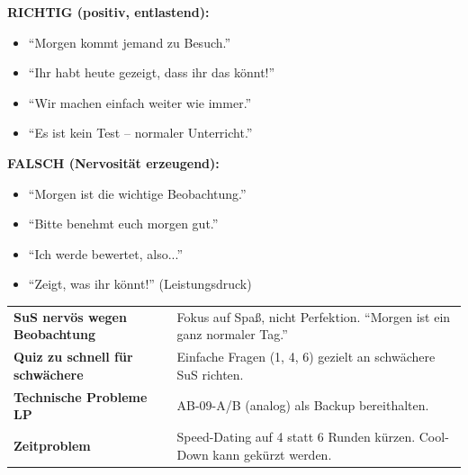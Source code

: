 \documentclass[11pt, a4paper]{article}
\begin{document}
\begin{tcolorbox}[
    colback=white,
    colframe=spanisch,
    title={\footnotesize\bfseries Ausblick-Formulierungen (Phase 5)},
    fonttitle=\bfseries,
    boxrule=0.5pt,
    top=2pt, bottom=2pt, left=4pt, right=4pt
]
\footnotesize
\begin{minipage}[t]{0.48\textwidth}
\textbf{RICHTIG (positiv, entlastend):}
\begin{itemize}
\item ``Morgen kommt jemand zu Besuch.''
\item ``Ihr habt heute gezeigt, dass ihr das könnt!''
\item ``Wir machen einfach weiter wie immer.''
\item ``Es ist kein Test -- normaler Unterricht.''
\end{itemize}
\end{minipage}
\hfill
\begin{minipage}[t]{0.48\textwidth}
\textbf{FALSCH (Nervosität erzeugend):}
\begin{itemize}
\item[\texttimes] ``Morgen ist die wichtige Beobachtung.''
\item[\texttimes] ``Bitte benehmt euch morgen gut.''
\item[\texttimes] ``Ich werde bewertet, also...''
\item[\texttimes] ``Zeigt, was ihr könnt!'' (Leistungsdruck)
\end{itemize}
\end{minipage}
\end{tcolorbox}

\vspace{0.2cm}


\begin{tcolorbox}[
    colback=white,
    colframe=wichtig,
    title={\footnotesize\bfseries Erwartete Schwierigkeiten},
    fonttitle=\bfseries,
    boxrule=0.5pt,
    top=2pt, bottom=2pt, left=4pt, right=4pt
]
\footnotesize
\begin{tabularx}{\textwidth}{@{}p{4cm}X@{}}
\textbf{SuS nervös wegen Beobachtung} & Fokus auf Spaß, nicht Perfektion. ``Morgen ist ein ganz normaler Tag.'' \\
\textbf{Quiz zu schnell für schwächere} & Einfache Fragen (1, 4, 6) gezielt an schwächere SuS richten. \\
\textbf{Technische Probleme LP} & AB-09-A/B (analog) als Backup bereithalten. \\
\textbf{Zeitproblem} & Speed-Dating auf 4 statt 6 Runden kürzen. Cool-Down kann gekürzt werden. \\
\end{tabularx}
\end{tcolorbox}
\end{document}
